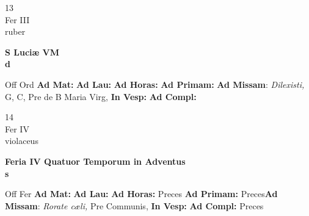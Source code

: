 \documentclass[10pt, openany]{book}
\begin{document}
    \begin{center}
        \begin{minipage}{3.5in}
            \vspace{2em}
            \begin{minipage}{0.5in}
                {\Huge 13} \\
                {\normalsize Fer III} \\
                {\normalsize ruber}
            \end{minipage}
            \begin{minipage}{3.0in}
                \textbf{ \large S Luciæ VM \\
                \textnormal{\normalsize d}} \\ 
            \end{minipage}
            \begin{justify}Off Ord
                \textbf{Ad Mat: }
                \textbf{Ad Lau: }
                \textbf{Ad Horas: }
                \textbf{Ad Primam: }\textbf{Ad Missam}: \textit{Dilexisti,} G, C, Pre de B Maria Virg,  
                \textbf{In Vesp: }
                \textbf{Ad Compl: }
            \end{justify}
        \end{minipage}
    \end{center}

    \begin{center}
        \begin{minipage}{3.5in}
            \vspace{2em}
            \begin{minipage}{0.5in}
                {\Huge 14} \\
                {\normalsize Fer IV} \\
                {\normalsize violaceus}
            \end{minipage}
            \begin{minipage}{3.0in}
                \textbf{ \large Feria IV Quatuor Temporum in Adventus \\
                \textnormal{\normalsize s}} \\ 
            \end{minipage}
            \begin{justify}Off Fer
                \textbf{Ad Mat: }
                \textbf{Ad Lau: }
                \textbf{Ad Horas: }Preces
                \textbf{Ad Primam: }Preces\textbf{Ad Missam}: \textit{Rorate cæli,} Pre Communis,  
                \textbf{In Vesp: }
                \textbf{Ad Compl: }Preces
            \end{justify}
        \end{minipage}
    \end{center}
\end{document}
